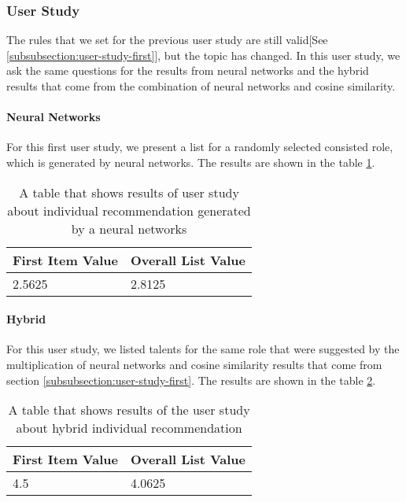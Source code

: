 \subsubsection{User Study}

The rules that we set for the previous user study are still valid[See \ref{subsubsection:user-study-first}], but the topic has changed. In this user study, we ask the same questions for the results from neural networks and the hybrid results that come from the combination of neural networks and cosine similarity.

\paragraph{Neural Networks}

For this first user study, we present a list for a randomly selected consisted role, which is generated by neural networks. The results are shown in the table \ref{tab:user-study-individual-rec-nn}.

\begin{table}[ht]
	\caption[User Study Individual Neural Networks]{A table that shows results of user study about individual recommendation generated by a neural networks}\label{tab:user-study-individual-rec-nn}
	\centering
	\begin{tabular}{l l}
		\toprule
		First Item Value & Overall List Value \\
		\midrule
		2.5625 & 2.8125 \\
		\bottomrule
	\end{tabular}
\end{table}

\paragraph{Hybrid}

For this user study, we listed talents for the same role that were suggested by the multiplication of neural networks and cosine similarity results that come from section \ref{subsubsection:user-study-first}. The results are shown in the table \ref{tab:user-study-individual-rec-hybrid}.

\begin{table}[ht]
	\caption[User Study Individual Hybrid]{A table that shows results of the user study about hybrid individual recommendation}\label{tab:user-study-individual-rec-hybrid}
	\centering
	\begin{tabular}{l l}
		\toprule
		First Item Value & Overall List Value \\
		\midrule
		4.5 & 4.0625 \\
		\bottomrule
	\end{tabular}
\end{table}

